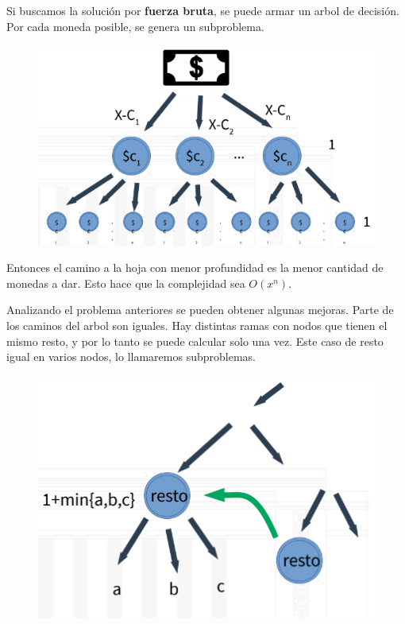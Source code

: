 \documentclass{article}
\begin{document}
Si buscamos la solución por \textbf{fuerza bruta}, se puede armar un arbol de decisión. 
Por cada moneda posible, se genera un subproblema. 

\begin{figure}[h!]
    \includegraphics[width=\linewidth]{imagenes/dinamico-arbol-moneda.png}
\end{figure}

Entonces el camino a la hoja con menor profundidad es la menor cantidad de monedas a dar. Esto hace que la complejidad sea \(O(x^n)\).

Analizando el problema anteriores se pueden obtener algunas mejoras. 
Parte de los caminos del arbol son iguales. 
Hay distintas ramas con nodos que tienen el mismo resto, 
y por lo tanto se puede calcular solo una vez. 
Este caso de resto igual en varios nodos, lo llamaremos subproblemas.

\begin{figure}[h!]
    \includegraphics[scale=0.5]{imagenes/dinamico-moneda-subproblema.png}
\end{figure}
\end{document}
